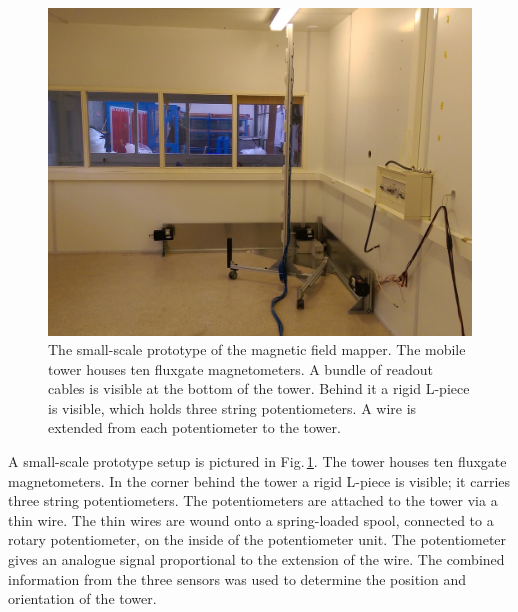 \begin{figure}
  \centering
  \includegraphics[width=\linewidth]{gfx/mapping/lpsc/setup_crop.jpg}
  \caption{The small-scale prototype of the magnetic field mapper.
  The mobile tower houses ten fluxgate magnetometers.
  A bundle of readout cables is visible at the bottom of the tower.
  Behind it a rigid L-piece is visible, which holds three string potentiometers.
  A wire is extended from each potentiometer to the tower.}\label{fig:mapping_bastille_setup}
\end{figure}

A small-scale prototype setup is pictured in Fig.\,\ref{fig:mapping_bastille_setup}.
The tower
houses ten fluxgate magnetometers.
In the corner behind the tower a rigid L-piece is visible;
it carries three string potentiometers.
The potentiometers are attached to the tower via a thin wire. The thin wires are wound onto a spring-loaded spool, connected to a rotary potentiometer, on the inside of the potentiometer unit.
The potentiometer gives an analogue signal proportional to the extension of the wire.
The combined information from the three sensors was used to determine the position and orientation of the tower.




